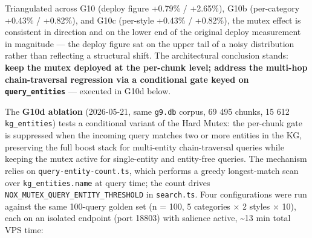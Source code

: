 \documentclass[
]{article}
\begin{document}
Triangulated across G10 (deploy figure +0.79\% / +2.65\%), G10b
(per-category +0.43\% / +0.82\%), and G10c (per-style +0.43\% /
+0.82\%), the mutex effect is consistent in direction and on the lower
end of the original deploy measurement in magnitude --- the deploy
figure sat on the upper tail of a noisy distribution rather than
reflecting a structural shift. The architectural conclusion stands:
\textbf{keep the mutex deployed at the per-chunk level; address the
multi-hop chain-traversal regression via a conditional gate keyed on
\texttt{query\_entities}} --- executed in G10d below.

The \textbf{G10d ablation} (2026-05-21, same \texttt{g9.db} corpus, 69
495 chunks, 15 612 \texttt{kg\_entities}) tests a conditional variant of
the Hard Mutex: the per-chunk gate is suppressed when the incoming query
matches two or more entities in the KG, preserving the full boost stack
for multi-entity chain-traversal queries while keeping the mutex active
for single-entity and entity-free queries. The mechanism relies on
\texttt{query-entity-count.ts}, which performs a greedy longest-match
scan over \texttt{kg\_entities.name} at query time; the count drives
\texttt{NOX\_MUTEX\_QUERY\_ENTITY\_THRESHOLD} in \texttt{search.ts}.
Four configurations were run against the same 100-query golden set (n =
100, 5 categories × 2 styles × 10), each on an isolated endpoint (port
18803) with salience active, \textasciitilde13 min total VPS time:
\end{document}
